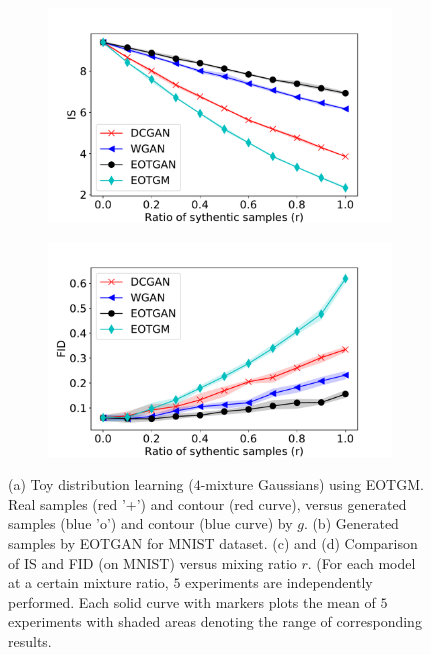 \begin{figure}[!ht]
\begin{subfigure}[b]{0.24\textwidth}
    \caption{}
    \label{fig-fake-wgan}
  \end{subfigure}
  \centering
  \begin{subfigure}[b]{0.25\textwidth}
    \centering
    \includegraphics[width=1.1\linewidth]{images/mnist/tra_score/IS_29.pdf}\vspace{-3pt}
    \caption{}
    \label{fig-tra-is}
  \end{subfigure}
  \begin{subfigure}[b]{0.25\textwidth}
    \centering
    \includegraphics[width=1.1\linewidth]{images/mnist/tra_score/FID_29.pdf}\vspace{-3pt}
    \caption{}
    \label{fig-tra-fid}
  \end{subfigure}
  \vspace{-15pt}
  \caption{(a) Toy distribution learning ($4$-mixture Gaussians) using EOTGM. Real samples (red '+') and contour
    (red curve), versus generated samples (blue 'o') and contour
    (blue curve) by $g$. (b) Generated samples by EOTGAN for MNIST dataset. (c) and (d)
    Comparison of IS and FID (on MNIST) versus mixing ratio $r$. (For
    each model at a certain mixture ratio, $5$ experiments are
    independently performed. Each solid curve with markers plots the mean of $5$
    experiments with shaded areas denoting the range of corresponding
    results.}
  \label{fig-tra-score}\vspace{8pt}  
\end{figure}

